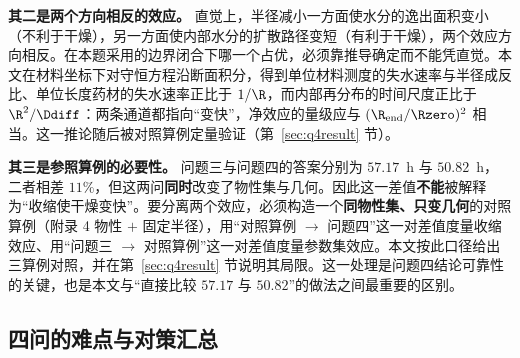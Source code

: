 \textbf{其二是两个方向相反的效应。} 直觉上，半径减小一方面使水分的逸出面积变小（不利于干燥），另一方面使内部水分的扩散路径变短（有利于干燥），两个效应方向相反。在本题采用的边界闭合下哪一个占优，必须靠推导确定而不能凭直觉。本文在材料坐标下对守恒方程沿断面积分，得到单位材料测度的失水速率与半径成反比、单位长度药材的失水速率正比于 $1/\R$，而内部再分布的时间尺度正比于 ${\R}^2/\Ddiff$：两条通道都指向``变快''，净效应的量级应与 $({\R}_{\mathrm{end}}/\Rzero)^2$ 相当。这一推论随后被对照算例定量验证（第~\ref{sec:q4result} 节）。

\textbf{其三是参照算例的必要性。} 问题三与问题四的答案分别为 $57.17$~h 与 $50.82$~h，二者相差 $11\%$，但这两问\textbf{同时}改变了物性集与几何。因此这一差值\textbf{不能}被解释为``收缩使干燥变快''。要分离两个效应，必须构造一个\textbf{同物性集、只变几何}的对照算例（附录 4 物性 $+$ 固定半径），用``对照算例 $\to$ 问题四''这一对差值度量收缩效应、用``问题三 $\to$ 对照算例''这一对差值度量参数集效应。本文按此口径给出三算例对照，并在第~\ref{sec:q4result} 节说明其局限。这一处理是问题四结论可靠性的关键，也是本文与``直接比较 $57.17$ 与 $50.82$''的做法之间最重要的区别。

\subsection{四问的难点与对策汇总}

